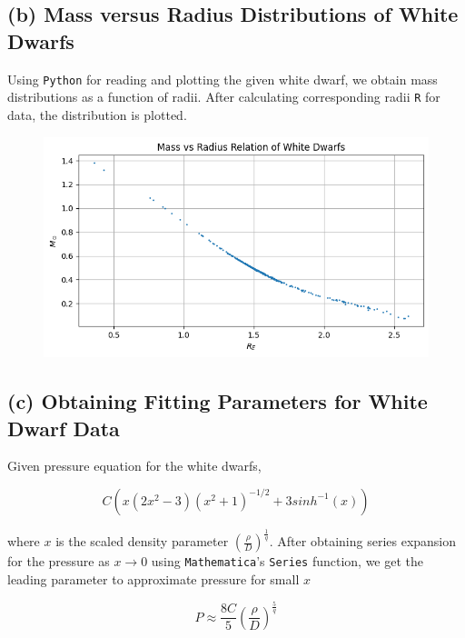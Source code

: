 \documentclass[aps,twocolumn,showpacs,preprintnumbers,nofootinbib,prl,superscriptaddress,groupedaddress]{revtex4-2}
\begin{document}
\newpage
\subsection{(b) Mass versus Radius Distributions of White Dwarfs}

Using \texttt{Python} for reading and plotting the given white dwarf, we obtain mass distributions as a function of radii. After calculating corresponding radii \texttt{R} for data, the distribution is plotted. 

\begin{figure}[!htb]
	\centering
	\includegraphics[width=1\linewidth]{Plots/newton-part-b}
	\label{fig:newton-part-b}
\end{figure}
\FloatBarrier

\subsection{(c) Obtaining Fitting Parameters for White Dwarf Data}

Given pressure equation for the white dwarfs,

\begin{equation}
	C(x( 2x^2 - 3)(x^2 + 1)^{-1/2} + 3sinh^{-1}(x))
\end{equation}

where $x$ is the scaled density parameter $(\frac{\rho}{D})^{\frac{1}{q}}$. After obtaining series expansion for the pressure as $x\to 0$ using \texttt{Mathematica}'s \texttt{Series} function, we get the leading parameter to approximate pressure for small $x$

\begin{equation}
	P \approx \frac{8C}{5}(\frac{\rho}{D})^{\frac{5}{q}}
\end{equation}
\end{document}
